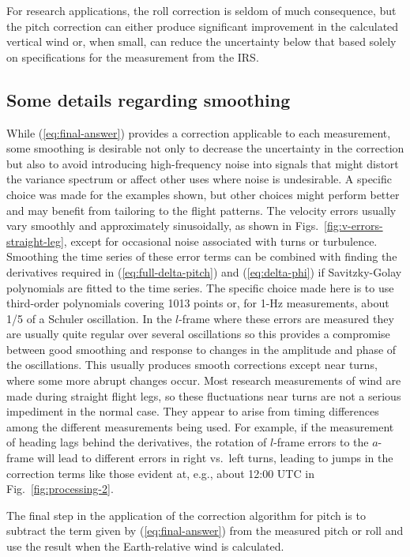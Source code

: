 \documentclass[english,british,amtd,bookmarks=false,unicode=true]{copernicus}\usepackage[]{graphicx}\usepackage[]{color}
\begin{document}
For research applications, the roll correction is seldom of much consequence,
but the pitch correction can either produce significant improvement
in the calculated vertical wind or, when small, can reduce the uncertainty
below that based solely on specifications for the measurement from
the IRS. 


\subsection{Some details regarding smoothing}

While (\ref{eq:final-answer}) provides a correction applicable to
each measurement, some smoothing is desirable not only to decrease
the uncertainty in the correction but also to avoid introducing high-frequency
noise into signals that might distort the variance spectrum or affect
other uses where noise is undesirable. A specific choice was made
for the examples shown, but other choices might perform better and
may benefit from tailoring to the flight patterns. The velocity errors
usually vary smoothly and approximately sinusoidally, as shown in
Figs.~\ref{fig:v-errors-straight-leg}, except for occasional noise
associated with turns or turbulence. Smoothing the time series of
these error terms can be combined with finding the derivatives required
in (\ref{eq:full-delta-pitch}) and (\ref{eq:delta-phi}) if Savitzky-Golay
polynomials are fitted to the time series. The specific choice made
here is to use third-order polynomials covering 1013 points or, for
1-Hz measurements, about 1/5 of a Schuler oscillation. In the $l$-frame
where these errors are measured they are usually quite regular over
several oscillations so this provides a compromise between good smoothing
and response to changes in the amplitude and phase of the oscillations.
This usually produces smooth corrections except near turns, where
some more abrupt changes occur. Most research measurements of wind
are made during straight flight legs, so these fluctuations near turns
are not a serious impediment in the normal case. They appear to arise
from timing differences among the different measurements being used.
For example, if the measurement of heading lags behind the derivatives,
the rotation of $l$-frame errors to the $a$-frame will lead to different
errors in right vs.~left turns, leading to jumps in the correction
terms like those evident at, e.g., about 12:00 UTC in Fig.~\ref{fig:processing-2}.

The final step in the application of the correction algorithm for
pitch is to subtract the term given by (\ref{eq:final-answer}) from
the measured pitch or roll and use the result when the Earth-relative
wind is calculated. 
\end{document}
